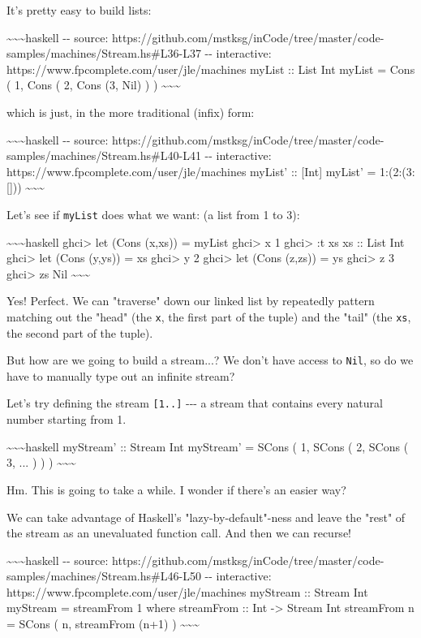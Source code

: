 \documentclass[]{article}
\begin{document}
It's pretty easy to build lists:

\textasciitilde{}\textasciitilde{}\textasciitilde{}haskell -\/- source:
https://github.com/mstksg/inCode/tree/master/code-samples/machines/Stream.hs\#L36-L37
-\/- interactive: https://www.fpcomplete.com/user/jle/machines myList :: List
Int myList = Cons ( 1, Cons ( 2, Cons (3, Nil) ) )
\textasciitilde{}\textasciitilde{}\textasciitilde{}

which is just, in the more traditional (infix) form:

\textasciitilde{}\textasciitilde{}\textasciitilde{}haskell -\/- source:
https://github.com/mstksg/inCode/tree/master/code-samples/machines/Stream.hs\#L40-L41
-\/- interactive: https://www.fpcomplete.com/user/jle/machines myList' ::
{[}Int{]} myList' = 1:(2:(3:{[}{]}))
\textasciitilde{}\textasciitilde{}\textasciitilde{}

Let's see if \texttt{myList} does what we want: (a list from 1 to 3):

\textasciitilde{}\textasciitilde{}\textasciitilde{}haskell ghci\textgreater{}
let (Cons (x,xs)) = myList ghci\textgreater{} x 1 ghci\textgreater{} :t xs xs ::
List Int ghci\textgreater{} let (Cons (y,ys)) = xs ghci\textgreater{} y 2
ghci\textgreater{} let (Cons (z,zs)) = ys ghci\textgreater{} z 3
ghci\textgreater{} zs Nil \textasciitilde{}\textasciitilde{}\textasciitilde{}

Yes! Perfect. We can "traverse" down our linked list by repeatedly pattern
matching out the "head" (the \texttt{x}, the first part of the tuple) and the
"tail" (the \texttt{xs}, the second part of the tuple).

But how are we going to build a stream...? We don't have access to \texttt{Nil},
so do we have to manually type out an infinite stream?

Let's try defining the stream \texttt{{[}1..{]}} -\/-\/- a stream that contains
every natural number starting from 1.

\textasciitilde{}\textasciitilde{}\textasciitilde{}haskell myStream' :: Stream
Int myStream' = SCons ( 1, SCons ( 2, SCons ( 3, ... ) ) )
\textasciitilde{}\textasciitilde{}\textasciitilde{}

Hm. This is going to take a while. I wonder if there's an easier way?

We can take advantage of Haskell's "lazy-by-default"-ness and leave the "rest"
of the stream as an unevaluated function call. And then we can recurse!

\textasciitilde{}\textasciitilde{}\textasciitilde{}haskell -\/- source:
https://github.com/mstksg/inCode/tree/master/code-samples/machines/Stream.hs\#L46-L50
-\/- interactive: https://www.fpcomplete.com/user/jle/machines myStream ::
Stream Int myStream = streamFrom 1 where streamFrom :: Int -\textgreater{}
Stream Int streamFrom n = SCons ( n, streamFrom (n+1) )
\textasciitilde{}\textasciitilde{}\textasciitilde{}
\end{document}
